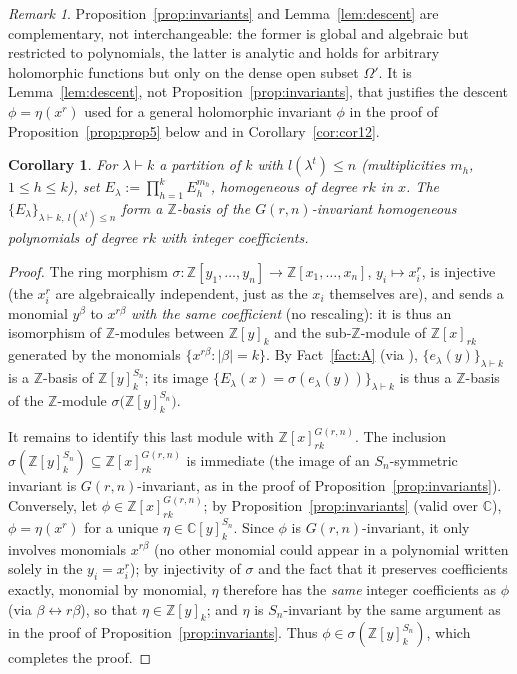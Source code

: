 \documentclass[11pt]{article}
\newtheorem{corollary}[theorem]{Corollary}
\theoremstyle{remark}
\newtheorem{remark}[theorem]{Remark}
\newcommand{\CC}{\mathbb{C}}
\newcommand{\ZZ}{\mathbb{Z}}
\begin{document}
\begin{remark}
Proposition~\ref{prop:invariants} and Lemma~\ref{lem:descent} are complementary, not interchangeable: the former is global and algebraic but restricted to polynomials, the latter is analytic and holds for arbitrary holomorphic functions but only on the dense open subset $\Omega'$. It is Lemma~\ref{lem:descent}, not Proposition~\ref{prop:invariants}, that justifies the descent $\phi=\eta(x^r)$ used for a general holomorphic invariant $\phi$ in the proof of Proposition~\ref{prop:prop5} below and in Corollary~\ref{cor:cor12}.
\end{remark}

\begin{corollary}\label{cor:base}
For $\lambda\vdash k$ a partition of $k$ with $l(\lambda^t)\le n$ (multiplicities $m_h$, $1\le h\le k$), set $E_\lambda:=\prod_{h=1}^k E_h^{m_h}$, homogeneous of degree $rk$ in $x$. The $\{E_\lambda\}_{\lambda\vdash k,\ l(\lambda^t)\le n}$ form a $\ZZ$-basis of the $G(r,n)$-invariant homogeneous polynomials of degree $rk$ with integer coefficients.
\end{corollary}

\begin{proof}
The ring morphism $\sigma:\ZZ[y_1,\dots,y_n]\to\ZZ[x_1,\dots,x_n]$, $y_i\mapsto x_i^r$, is injective (the $x_i^r$ are algebraically independent, just as the $x_i$ themselves are), and sends a monomial $y^\beta$ to $x^{r\beta}$ \emph{with the same coefficient} (no rescaling): it is thus an isomorphism of $\ZZ$-modules between $\ZZ[y]_k$ and the sub-$\ZZ$-module of $\ZZ[x]_{rk}$ generated by the monomials $\{x^{r\beta} : |\beta|=k\}$. By Fact~\ref{fact:A} (via \cite[Ch.~I]{Mac}), $\{e_\lambda(y)\}_{\lambda\vdash k}$ is a $\ZZ$-basis of $\ZZ[y]^{S_n}_k$; its image $\{E_\lambda(x)=\sigma(e_\lambda(y))\}_{\lambda\vdash k}$ is thus a $\ZZ$-basis of the $\ZZ$-module $\sigma\big(\ZZ[y]^{S_n}_k\big)$.

It remains to identify this last module with $\ZZ[x]^{G(r,n)}_{rk}$. The inclusion $\sigma(\ZZ[y]^{S_n}_k)\subseteq\ZZ[x]^{G(r,n)}_{rk}$ is immediate (the image of an $S_n$-symmetric invariant is $G(r,n)$-invariant, as in the proof of Proposition~\ref{prop:invariants}). Conversely, let $\phi\in\ZZ[x]^{G(r,n)}_{rk}$; by Proposition~\ref{prop:invariants} (valid over $\CC$), $\phi=\eta(x^r)$ for a unique $\eta\in\CC[y]^{S_n}_k$. Since $\phi$ is $G(r,n)$-invariant, it only involves monomials $x^{r\beta}$ (no other monomial could appear in a polynomial written solely in the $y_i=x_i^r$); by injectivity of $\sigma$ and the fact that it preserves coefficients exactly, monomial by monomial, $\eta$ therefore has the \emph{same} integer coefficients as $\phi$ (via $\beta\leftrightarrow r\beta$), so that $\eta\in\ZZ[y]_k$; and $\eta$ is $S_n$-invariant by the same argument as in the proof of Proposition~\ref{prop:invariants}. Thus $\phi\in\sigma(\ZZ[y]^{S_n}_k)$, which completes the proof.
\end{proof}
\end{document}
